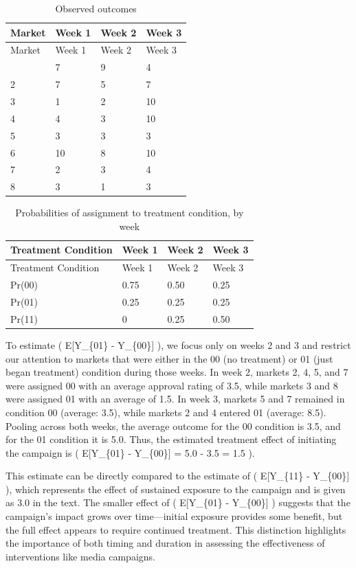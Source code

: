 \documentclass[
  letterpaper,
  DIV=11,
  numbers=noendperiod]{scrartcl}
\begin{document}
\begin{longtable}[]{@{}llll@{}}
\caption{Observed outcomes}\tabularnewline
\toprule\noalign{}
Market & Week 1 & Week 2 & Week 3 \\
\midrule\noalign{}
\endfirsthead
\toprule\noalign{}
Market & Week 1 & Week 2 & Week 3 \\
\midrule\noalign{}
\endhead
\bottomrule\noalign{}
\endlastfoot
1 & 7 & 9 & 4 \\
2 & 7 & 5 & 7 \\
3 & 1 & 2 & 10 \\
4 & 4 & 3 & 10 \\
5 & 3 & 3 & 3 \\
6 & 10 & 8 & 10 \\
7 & 2 & 3 & 4 \\
8 & 3 & 1 & 3 \\
\end{longtable}

\begin{longtable}[]{@{}llll@{}}
\caption{Probabilities of assignment to treatment condition, by
week}\tabularnewline
\toprule\noalign{}
Treatment Condition & Week 1 & Week 2 & Week 3 \\
\midrule\noalign{}
\endfirsthead
\toprule\noalign{}
Treatment Condition & Week 1 & Week 2 & Week 3 \\
\midrule\noalign{}
\endhead
\bottomrule\noalign{}
\endlastfoot
Pr(00) & 0.75 & 0.50 & 0.25 \\
Pr(01) & 0.25 & 0.25 & 0.25 \\
Pr(11) & 0 & 0.25 & 0.50 \\
\end{longtable}

To estimate ( E{[}Y\_\{01\} - Y\_\{00\}{]} ), we focus only on weeks 2
and 3 and restrict our attention to markets that were either in the 00
(no treatment) or 01 (just began treatment) condition during those
weeks. In week 2, markets 2, 4, 5, and 7 were assigned 00 with an
average approval rating of 3.5, while markets 3 and 8 were assigned 01
with an average of 1.5. In week 3, markets 5 and 7 remained in condition
00 (average: 3.5), while markets 2 and 4 entered 01 (average: 8.5).
Pooling across both weeks, the average outcome for the 00 condition is
3.5, and for the 01 condition it is 5.0. Thus, the estimated treatment
effect of initiating the campaign is ( E{[}Y\_\{01\} - Y\_\{00\}{]} =
5.0 - 3.5 = 1.5 ).

This estimate can be directly compared to the estimate of (
E{[}Y\_\{11\} - Y\_\{00\}{]} ), which represents the effect of sustained
exposure to the campaign and is given as 3.0 in the text. The smaller
effect of ( E{[}Y\_\{01\} - Y\_\{00\}{]} ) suggests that the campaign's
impact grows over time---initial exposure provides some benefit, but the
full effect appears to require continued treatment. This distinction
highlights the importance of both timing and duration in assessing the
effectiveness of interventions like media campaigns.
\end{document}
